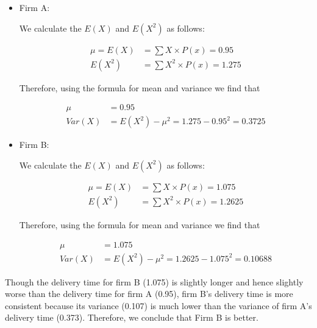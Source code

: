 \documentclass[
  ignorenonframetext,
  aspectratio=43,
]{beamer}
\let\olditem\item
\renewcommand\item{\olditem\justifying}
\begin{document}
\begin{frame}{}
\protect\hypertarget{section-6}{}
\begin{itemize}
\item
  Firm A:

  We calculate the \(E(X)\) and \(E(X^2)\) as follows:

  \[
    \begin{aligned}
    \mu = E(X) &= \sum X \times P(x) = 0.95 \\ 
    E(X^2) &= \sum X^2 \times P(x) = 1.275
    \end{aligned}
    \]

  Therefore, using the formula for mean and variance we find that
  \vspace{-12.5pt}

  \[
    \begin{aligned}
    \mu &= 0.95 \\ 
    Var(X) &= E(X^2) - \mu^2 = 1.275 - 0.95^2 = 0.3725
    \end{aligned}
    \]
\end{itemize}
\end{frame}

\begin{frame}{}
\protect\hypertarget{section-7}{}
\begin{itemize}
\item
  Firm B:

  We calculate the \(E(X)\) and \(E(X^2)\) as follows:

  \[
    \begin{aligned}
    \mu = E(X) &= \sum X \times P(x) = 1.075 \\ 
    E(X^2) &= \sum X^2 \times P(x) = 1.2625
    \end{aligned}
    \]

  Therefore, using the formula for mean and variance we find that
  \vspace{-25pt}

  \[
    \begin{aligned}
    \mu &= 1.075 \\ 
    Var(X) &= E(X^2) - \mu^2 = 1.2625 - 1.075^2 = 0.10688
    \end{aligned}
    \]
\end{itemize}
\end{frame}

\begin{frame}{}
\protect\hypertarget{section-8}{}
Though the delivery time for firm B (1.075) is slightly longer and hence
slightly worse than the delivery time for firm A (0.95), firm B's
delivery time is more consistent because its variance (0.107) is much
lower than the variance of firm A's delivery time (0.373). Therefore, we
conclude that Firm B is better.
\end{frame}
\end{document}
